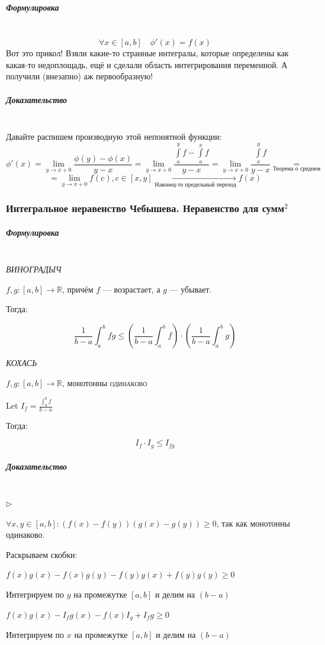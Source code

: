 \documentclass{article}
\let\vanillasubparagraph\subparagraph
\renewcommand{\subparagraph}[1]{\vanillasubparagraph{#1}\mbox{}\\}
\begin{document}
\subparagraph{Формулировка}
$$
\forall x\in [a, b] \quad \phi'(x) = f(x)
$$
Вот это прикол! Взяли какие-то странные интегралы, которые определены как какая-то недоплощадь, ещё и сделали область интегрирования переменной. А получили (внезапно) аж первообразную! 

\subparagraph{Доказательство}

Давайте распишем производную этой непонятной функции:
$$
\phi'(x) = \lim_{y\rightarrow x+0}\frac{\phi(y)-\phi(x)}{y-x} = \lim_{y\rightarrow x+0}\frac{\int\limits_a^y f - \int\limits_a^x f}{y-x} = \lim_{y\rightarrow x+0}\frac{\int\limits_x^y f}{y-x} \underset{\text{Теорема о среднем}}{=}
$$
$$
=\lim_{y\rightarrow x+0}f(c), c \in [x, y] \underset{\text{Наконец-то предельный переход}}{\longrightarrow} f(x)
$$

\subsubsection{Интегральное неравенство Чебышева. Неравенство для сумм\texorpdfstring{$^2$}{}}

\subparagraph{Формулировка}

\textit{ВИНОГРАДЫЧ}

$f, g : \left[a, b\right] \rightarrow \mathbb{R}$, причём $f$ --- возрастает, а $g$ --- убывает.

Тогда:

\[\frac{1}{b - a}\int_a^b{fg} \le \left(\frac{1}{b - a} \int_a^bf\right) \cdot \left(\frac{1}{b - a} \int_a^bg\right)\]


\textit{КОХАСЬ}

$f, g : \left[a, b\right] \rightarrow \mathbb{R}$, монотонны \textsc{одинаково}

Let $I_f = \frac{\int_a^b{f}}{b - a}$

Тогда:

\[ I_f \cdot I_g \le I_{fg}\]


\subparagraph{Доказательство}
$\rhd$

$\forall x, y \in [a, b] : \left(f(x) - f(y)\right)\left(g(x) - g(y)\right) \ge 0$, так как монотонны одинаково. 

Раскрываем скобки:

$f(x)g(x) - f(x)g(y) - f(y)g(x) + f(y)g(y) \ge 0$

Интегрируем по $y$ на промежутке $[a, b]$ и делим на $(b - a)$ 

$f(x)g(x) - I_fg(x) - f(x)I_g + I_fg \ge 0$

Интегрируем по $x$ на промежутке $[a, b]$ и делим на $(b - a)$
\end{document}
